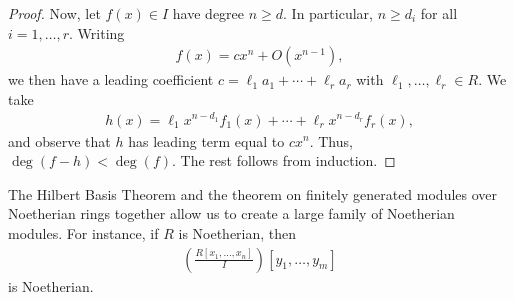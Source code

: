 \documentclass[10pt]{mypackage}
\begin{document}
\begin{proof}
  Now, let $f(x)\in I$ have degree $n\geq d$. In particular, $n\geq d_i$ for all $i= 1,\dots,r$. Writing
  \begin{align*}
    f(x) = cx^n + O\left( x^{n-1} \right),
  \end{align*}
  we then have a leading coefficient $c = \ell_1a_1 + \cdots + \ell_r a_r$ with $\ell_1,\dots,\ell_r\in R$. We take
  \begin{align*}
    h(x) = \ell_1x^{n-d_1}f_1(x) + \cdots + \ell_rx^{n-d_r} f_r(x),
  \end{align*}
  and observe that $h$ has leading term equal to $cx^{n}$. Thus, $\deg\left( f-h \right) < \deg\left( f \right)$. The rest follows from induction.
\end{proof}
The Hilbert Basis Theorem and the theorem on finitely generated modules over Noetherian rings together allow us to create a large family of Noetherian modules. For instance, if $R$ is Noetherian, then
\begin{align*}
  \left( \frac{R\left[ x_1,\dots,x_n \right]}{I} \right)\left[ y_1,\dots,y_m \right]
\end{align*}
is Noetherian.
\end{document}
